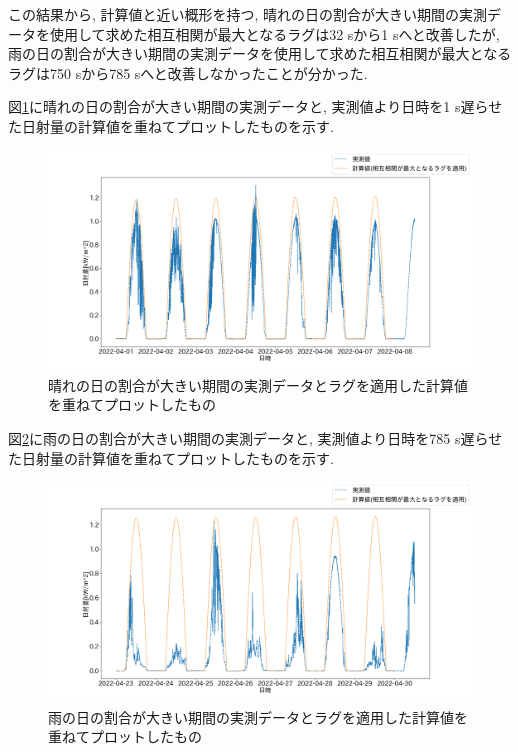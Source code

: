 \documentclass[a4j,12pt,]{jarticle}
\begin{document}
この結果から, 計算値と近い概形を持つ, 晴れの日の割合が大きい期間の実測データを使用して求めた相互相関が最大となるラグは32 \si{\second}から1 \si{\second}へと改善したが, 雨の日の割合が大きい期間の実測データを使用して求めた相互相関が最大となるラグは750 \si{\second}から785 \si{\second}へと改善しなかったことが分かった.

図\ref{p5}に晴れの日の割合が大きい期間の実測データと, 実測値より日時を1 \si{\second}遅らせた日射量の計算値を重ねてプロットしたものを示す.

\begin{figure}[H]
  \begin{center}
    \includegraphics[width=160mm]{5.png}
    \caption{晴れの日の割合が大きい期間の実測データとラグを適用した計算値を重ねてプロットしたもの}
    \label{p5}
  \end{center}
\end{figure}


図\ref{p6}に雨の日の割合が大きい期間の実測データと, 実測値より日時を785 \si{\second}遅らせた日射量の計算値を重ねてプロットしたものを示す.

\begin{figure}[H]
  \begin{center}
    \includegraphics[width=160mm]{6.png}
    \caption{雨の日の割合が大きい期間の実測データとラグを適用した計算値を重ねてプロットしたもの}
    \label{p6}
  \end{center}
\end{figure}
\end{document}
